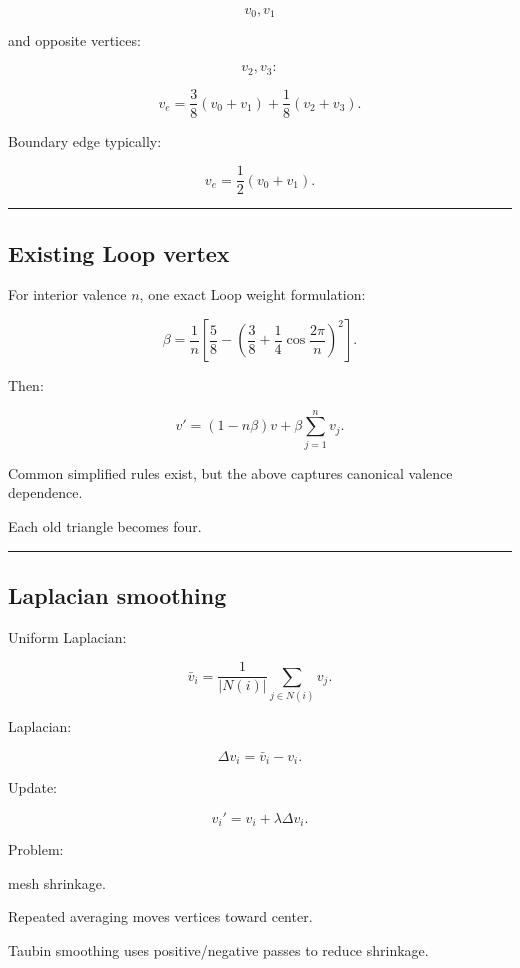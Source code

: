 \[
v_0,v_1
\]

and opposite vertices:

\[
v_2,v_3:
\]

\[
\boxed{
v_e
=
\frac38(v_0+v_1)
+
\frac18(v_2+v_3).
}
\]

Boundary edge typically:

\[
v_e=
\frac12(v_0+v_1).
\]

\begin{center}\rule{0.5\linewidth}{0.5pt}\end{center}

\subsection{Existing Loop vertex}\label{04-visual-computing-ii-ch041-existing-loop-vertex}

For interior valence \(n\), one exact Loop weight formulation:

\[
\beta
=
\frac1n
\left[
\frac58-
\left(
\frac38+
\frac14\cos\frac{2\pi}{n}
\right)^2
\right].
\]

Then:

\[
\boxed{
v'
=
(1-n\beta)v
+
\beta
\sum_{j=1}^{n}v_j.
}
\]

Common simplified rules exist, but the above captures canonical valence dependence.

Each old triangle becomes four.

\begin{center}\rule{0.5\linewidth}{0.5pt}\end{center}

\subsection{Laplacian smoothing}\label{04-visual-computing-ii-ch041-laplacian-smoothing}

Uniform Laplacian:

\[
\bar v_i=
\frac1{|N(i)|}
\sum_{j\in N(i)}
v_j.
\]

Laplacian:

\[
\Delta v_i=
\bar v_i-v_i.
\]

Update:

\[
\boxed{
v_i'
=
v_i+
\lambda\Delta v_i.
}
\]

Problem:

mesh shrinkage.

Repeated averaging moves vertices toward center.

Taubin smoothing uses positive/negative passes to reduce shrinkage.

